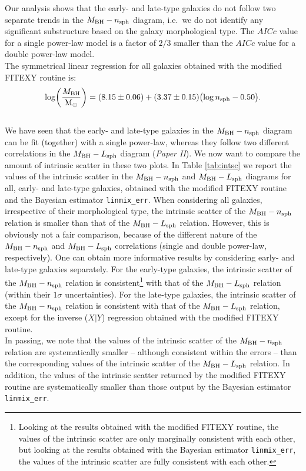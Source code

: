 \documentclass[preprint2]{emulateapj}
\begin{document}
Our analysis shows that the early- and late-type galaxies do not follow two separate trends 
in the $M_{\rm BH} - n_{\rm sph}$ diagram, 
i.e.~we do not identify any significant substructure based on the galaxy morphological type. 
The $AICc$ value for a single power-law model is a factor of $2/3$ smaller 
than the $AICc$ value for a double power-law model.  \\
The symmetrical linear regression for all galaxies obtained with the modified FITEXY routine is: 
\begin{equation*}
\log \biggl( \frac{M_{\rm BH}}{\rm M_\odot} \biggr) = (8.15 \pm 0.06) + (3.37 \pm 0.15) \bigl(\log n_{\rm sph} - 0.50 \bigr) . 
\end{equation*}
\\

We have seen that the early- and late-type galaxies in the $M_{\rm BH} - n_{\rm sph}$ diagram 
can be fit (together) with a single power-law, 
whereas they follow two different correlations in the $M_{\rm BH} - L_{\rm sph}$ diagram (\emph{Paper II}). 
We now want to compare the amount of intrinsic scatter in these two plots. 
In Table \ref{tab:intsc} we report the values of the intrinsic scatter 
in the $M_{\rm BH} - n_{\rm sph}$ and $M_{\rm BH} - L_{\rm sph}$ diagrams 
for all, early- and late-type galaxies, 
obtained with the modified FITEXY routine and the Bayesian estimator {\tt linmix\_err}. 
When considering all galaxies, irrespective of their morphological type, 
the intrinsic scatter of the $M_{\rm BH} - n_{\rm sph}$ relation is smaller than that of the $M_{\rm BH} - L_{\rm sph}$ relation. 
However, this is obviously not a fair comparison, 
because of the different nature of the $M_{\rm BH} - n_{\rm sph}$ and $M_{\rm BH} - L_{\rm sph}$ correlations 
(single and double power-law, respectively). 
One can obtain more informative results by considering early- and late-type galaxies separately. 
For the early-type galaxies, the intrinsic scatter of the $M_{\rm BH} - n_{\rm sph}$ relation is consistent\footnote{Looking 
at the results obtained with the modified FITEXY routine, 
the values of the intrinsic scatter are only marginally consistent with each other, 
but looking at the results obtained with the Bayesian estimator {\tt linmix\_err}, 
the values of the intrinsic scatter are fully consistent with each other. } 
with that of the $M_{\rm BH} - L_{\rm sph}$ relation (within their $1\sigma$ uncertainties). 
For the late-type galaxies, the intrinsic scatter of the $M_{\rm BH} - n_{\rm sph}$ relation is consistent with 
that of the $M_{\rm BH} - L_{\rm sph}$ relation, 
except for the inverse ($X|Y$) regression obtained with the modified FITEXY routine. \\
In passing, we note that the values of the intrinsic scatter of the $M_{\rm BH} - n_{\rm sph}$ relation 
are systematically smaller -- although consistent within the errors -- 
than the corresponding values of the intrinsic scatter of the $M_{\rm BH} - L_{\rm sph}$ relation.  
In addition, the values of the intrinsic scatter returned by the modified FITEXY routine are systematically smaller than 
those output by the Bayesian estimator {\tt linmix\_err}. 
\end{document}
